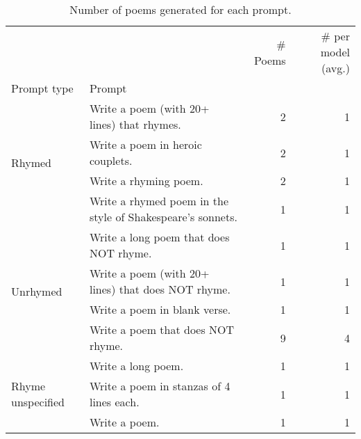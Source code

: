 \begin{table}[H]
  \centering
  \small
  \singlespacing
  \begin{tabular}{llrr}
  \toprule
   &  & \# Poems & \# per model (avg.) \\
  Prompt type & Prompt &  &  \\
  \midrule
  \multirow[t]{4}{*}{Rhymed} & Write a poem (with 20+ lines) that rhymes. & 2 & 1 \\
   & Write a poem in heroic couplets. & 2 & 1 \\
   & Write a rhyming poem. & 2 & 1 \\
   & Write a rhymed poem in the style of Shakespeare's sonnets. & 1 & 1 \\
  \cline{1-4}
  \multirow[t]{4}{*}{Unrhymed} & Write a long poem that does NOT rhyme. & 1 & 1 \\
   & Write a poem (with 20+ lines) that does NOT rhyme. & 1 & 1 \\
   & Write a poem in blank verse. & 1 & 1 \\
   & Write a poem that does NOT rhyme. & 9 & 4 \\
  \cline{1-4}
  \multirow[t]{3}{*}{Rhyme unspecified} & Write a long poem. & 1 & 1 \\
   & Write a poem in stanzas of 4 lines each. & 1 & 1 \\
   & Write a poem. & 1 & 1 \\
  \bottomrule
  \end{tabular}
  \caption{Number of poems generated for each prompt.}
  \label{tab:num_poems_rhyme_promptings}
\end{table}